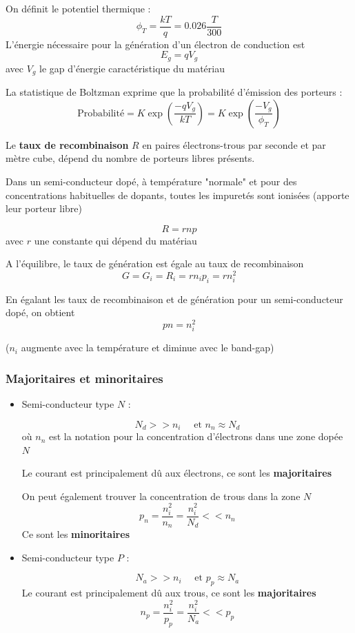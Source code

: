 \documentclass[12pt,a4paper]{article}
\begin{document}
\medskip

On définit le potentiel thermique :
$$\phi_T = \frac{kT}{q} = 0.026\frac{T}{300}$$
L'énergie nécessaire pour la génération d'un électron de conduction est
$$E_g = q V_g$$
avec $V_g$ le gap d'énergie caractéristique du matériau

\medskip

La statistique de Boltzman exprime que la probabilité d'émission des porteurs :
$$\text{Probabilité} = K \exp{\left(\frac{-qV_g}{kT}\right)} = K \exp{\left(\frac{-V_g}{\phi_T}\right)}$$

Le \textbf{taux de recombinaison} $R$ en paires électrons-trous par seconde et par mètre cube, dépend du nombre de porteurs libres présents.

Dans un semi-conducteur dopé, à température "normale" et pour des concentrations habituelles de dopants, toutes les impuretés sont ionisées (apporte leur porteur libre)

$$R = rnp$$
avec $r$ une constante qui dépend du matériau

A l'équilibre, le taux de génération est égale au taux de recombinaison
$$G = G_i = R_i = r n_i p_i = r n_i^2$$

En égalant les taux de recombinaison et de génération pour un semi-conducteur dopé, on obtient
$$\boxed{pn = n_i^2}$$

($n_i$ augmente avec la température et diminue avec le band-gap)


\subsubsection{Majoritaires et minoritaires}

\begin{itemize}
        \item Semi-conducteur type $N$ :
        
        $$N_d >> n_i \quad \text{ et } n_n \approx N_d$$
        où $n_n$ est la notation pour la concentration d'électrons dans une zone dopée $N$

        Le courant est principalement dû aux électrons, ce sont les \textbf{majoritaires}

        On peut également trouver la concentration de trous dans la zone $N$
        $$p_n = \frac{n_i^2}{n_n} = \frac{n_i^2}{N_d} << n_n$$
        Ce sont les \textbf{minoritaires}

        \item Semi-conducteur type $P$ :
        
        $$N_a >> n_i \quad \text{ et } p_p \approx N_a$$
        Le courant est principalement dû aux trous, ce sont les \textbf{majoritaires}
        $$n_p = \frac{n_i^2}{p_p} = \frac{n_i^2}{N_a} << p_p$$
\end{itemize}
\end{document}
